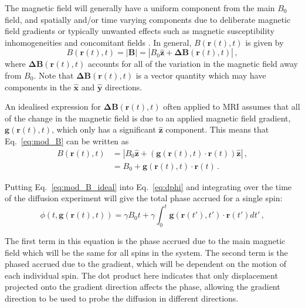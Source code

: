 The magnetic field will generally have a uniform component from the main $B_0$ field, and spatially and/or time varying components due to deliberate magnetic field gradients or typically unwanted effects such as magnetic susceptibility inhomogeneities and concomitant fields \cite{Haacke1999}. In general, $B(\mathbf{r}(t), t)$ is given by
\begin{equation}
  B(\mathbf{r}(t), t) = |\mathbf{B}| = |B_0\mathbf{\hat{z}} + \mathbf{\Delta B}(\mathbf{r}(t), t)|\,,
  \label{eq:mod_B}
\end{equation}
where $\mathbf{\Delta B}(\mathbf{r}(t), t)$ accounts for all of the variation in the magnetic field away from $B_0$. Note that $\mathbf{\Delta B}(\mathbf{r}(t), t)$ is a vector quantity which may have components in the $\mathbf{\hat{x}}$ and $\mathbf{\hat{y}}$ directions. 

An idealised expression for $\mathbf{\Delta B}(\mathbf{r}(t), t)$ often applied to \ac{MRI} assumes that all of the change in the magnetic field is due to an applied magnetic field gradient, $\mathbf{g}(\mathbf{r}(t), t)$, which only has a significant $\mathbf{\hat{z}}$ component. This means that Eq.\ \ref{eq:mod_B} can be written as
\begin{align}
  B(\mathbf{r}(t), t) &= \left|B_0\mathbf{\hat{z}} + \left(\mathbf{g}(\mathbf{r}(t), t)\cdot\mathbf{r}(t)\right) \mathbf{\hat{z}}\right|\,,\nonumber \\
                      &= B_0 + \mathbf{g}(\mathbf{r}(t), t)\cdot\mathbf{r}(t)\,.
                        \label{eq:mod_B_ideal}
\end{align}

Putting Eq.\ \ref{eq:mod_B_ideal} into Eq.\ \ref{eq:dphi} and integrating over the time of the diffusion experiment will give the total phase accrued for a single spin:
\begin{equation}
  \phi(t, \mathbf{g}(\mathbf{r}(t), t)) = \gamma B_0 t + \gamma \int_0^t \mathbf{g}(\mathbf{r}(t'), t')\cdot\mathbf{r}(t')dt'\,,
  \label{eq:phase_singlespin}
\end{equation}


The first term in this equation is the phase accrued due to the main magnetic field which will be the same for all spins in the system.
The second term is the phased accrued due to the gradient, which will be dependent on the motion of each individual spin.
The dot product here indicates that only displacement projected onto the gradient direction affects the phase, allowing the gradient direction to be used to probe the diffusion in different directions. 


